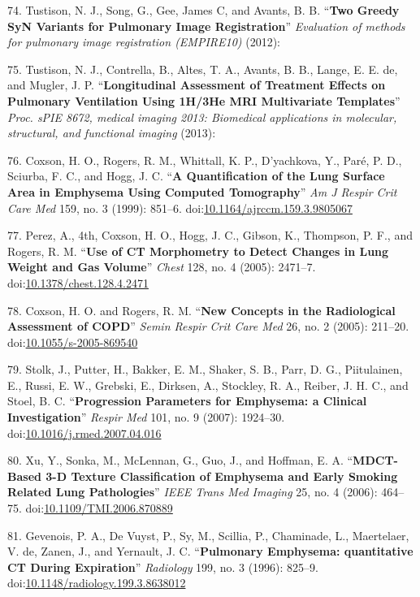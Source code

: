 \documentclass[11pt,]{article}
\begin{document}
74. Tustison, N. J., Song, G., Gee, James C, and Avants, B. B.
``\textbf{Two Greedy SyN Variants for Pulmonary Image Registration}''
\emph{Evaluation of methods for pulmonary image registration (EMPIRE10)}
(2012):

75. Tustison, N. J., Contrella, B., Altes, T. A., Avants, B. B., Lange,
E. E. de, and Mugler, J. P. ``\textbf{Longitudinal Assessment of
Treatment Effects on Pulmonary Ventilation Using 1H/3He MRI Multivariate
Templates}'' \emph{Proc. sPIE 8672, medical imaging 2013: Biomedical
applications in molecular, structural, and functional imaging} (2013):

76. Coxson, H. O., Rogers, R. M., Whittall, K. P., D'yachkova, Y.,
Par{é}, P. D., Sciurba, F. C., and Hogg, J. C. ``\textbf{A
Quantification of the Lung Surface Area in Emphysema Using Computed
Tomography}'' \emph{Am J Respir Crit Care Med} 159, no. 3 (1999):
851--6.
doi:\href{http://dx.doi.org/10.1164/ajrccm.159.3.9805067}{10.1164/ajrccm.159.3.9805067}

77. Perez, A., 4th, Coxson, H. O., Hogg, J. C., Gibson, K., Thompson, P.
F., and Rogers, R. M. ``\textbf{Use of CT Morphometry to Detect Changes
in Lung Weight and Gas Volume}'' \emph{Chest} 128, no. 4 (2005):
2471--7.
doi:\href{http://dx.doi.org/10.1378/chest.128.4.2471}{10.1378/chest.128.4.2471}

78. Coxson, H. O. and Rogers, R. M. ``\textbf{New Concepts in the
Radiological Assessment of COPD}'' \emph{Semin Respir Crit Care Med} 26,
no. 2 (2005): 211--20.
doi:\href{http://dx.doi.org/10.1055/s-2005-869540}{10.1055/s-2005-869540}

79. Stolk, J., Putter, H., Bakker, E. M., Shaker, S. B., Parr, D. G.,
Piitulainen, E., Russi, E. W., Grebski, E., Dirksen, A., Stockley, R.
A., Reiber, J. H. C., and Stoel, B. C. ``\textbf{Progression Parameters
for Emphysema: a Clinical Investigation}'' \emph{Respir Med} 101, no. 9
(2007): 1924--30.
doi:\href{http://dx.doi.org/10.1016/j.rmed.2007.04.016}{10.1016/j.rmed.2007.04.016}

80. Xu, Y., Sonka, M., McLennan, G., Guo, J., and Hoffman, E. A.
``\textbf{MDCT-Based 3-D Texture Classification of Emphysema and Early
Smoking Related Lung Pathologies}'' \emph{IEEE Trans Med Imaging} 25,
no. 4 (2006): 464--75.
doi:\href{http://dx.doi.org/10.1109/TMI.2006.870889}{10.1109/TMI.2006.870889}

81. Gevenois, P. A., De Vuyst, P., Sy, M., Scillia, P., Chaminade, L.,
Maertelaer, V. de, Zanen, J., and Yernault, J. C. ``\textbf{Pulmonary
Emphysema: quantitative CT During Expiration}'' \emph{Radiology} 199,
no. 3 (1996): 825--9.
doi:\href{http://dx.doi.org/10.1148/radiology.199.3.8638012}{10.1148/radiology.199.3.8638012}
\end{document}
